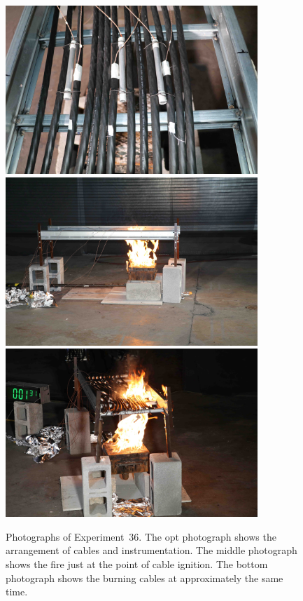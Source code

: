 \begin{figure}[p]
\centering
\includegraphics[height=2.50in]{../FIGURES/Test_36_setup} \\
\includegraphics[height=2.50in]{../FIGURES/Test_36_side} \\
\includegraphics[height=2.50in]{../FIGURES/Test_36_1_min_31_s}
\caption[Photographs of Experiment~36]{Photographs of Experiment~36. The opt photograph shows the arrangement of cables and instrumentation. The middle photograph shows the fire just at the point of cable ignition. The bottom photograph shows the burning cables at approximately the same time.}
\label{fig:Test_36_photos}
\end{figure}


